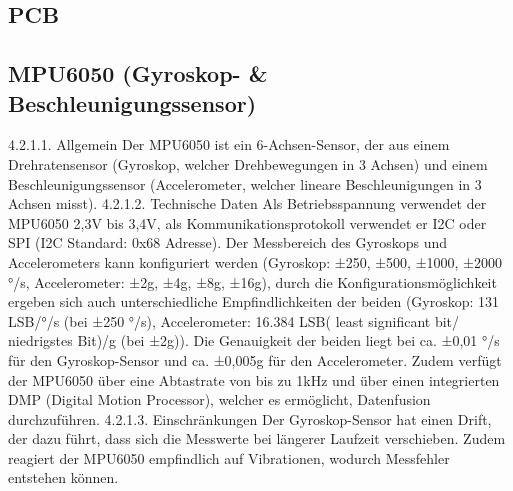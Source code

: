 \subsection{PCB}
%
\subsection{MPU6050 (Gyroskop- & Beschleunigungssensor)}
%
4.2.1.1. Allgemein
Der MPU6050 ist ein 6-Achsen-Sensor, der aus einem Drehratensensor (Gyroskop, welcher Drehbewegungen in 3 Achsen) und einem Beschleunigungssensor (Accelerometer, welcher lineare Beschleunigungen in 3 Achsen misst).
4.2.1.2. Technische Daten
Als Betriebsspannung verwendet der MPU6050 2,3V bis 3,4V, als Kommunikationsprotokoll verwendet er I2C oder SPI (I2C Standard: 0x68 Adresse). Der Messbereich des Gyroskops und Accelerometers kann konfiguriert werden (Gyroskop:  ±250, ±500, ±1000, ±2000 °/s, Accelerometer: ±2g, ±4g, ±8g, ±16g), durch die Konfigurationsmöglichkeit ergeben sich auch unterschiedliche Empfindlichkeiten der beiden (Gyroskop: 131 LSB/°/s (bei ±250 °/s), Accelerometer: 16.384 LSB( least significant bit/ niedrigstes Bit)/g (bei ±2g)).  Die Genauigkeit der beiden liegt bei ca. ±0,01 °/s für den Gyroskop-Sensor und ca. ±0,005g für den Accelerometer. Zudem verfügt der MPU6050 über eine Abtastrate von bis zu 1kHz und über einen integrierten DMP (Digital Motion Processor), welcher es ermöglicht, Datenfusion durchzuführen.
4.2.1.3. Einschränkungen
Der Gyroskop-Sensor hat einen Drift, der dazu führt, dass sich die Messwerte bei längerer Laufzeit verschieben. Zudem reagiert der MPU6050 empfindlich auf Vibrationen, wodurch Messfehler entstehen können.
%
